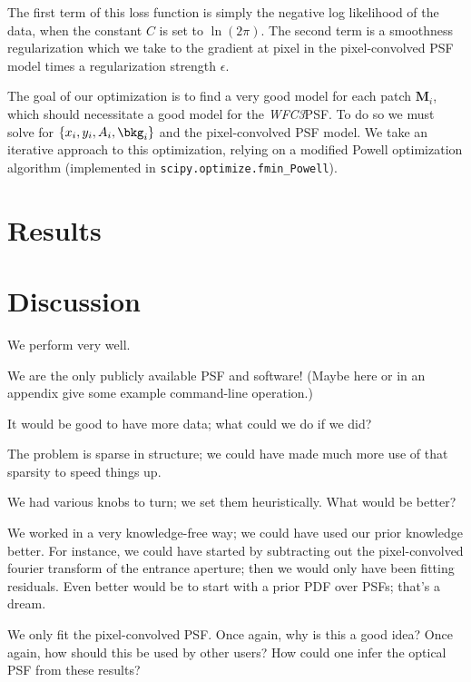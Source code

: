 \documentclass[12pt,letterpaper,preprint]{aastex}
\newcommand{\instrument}[1]{\textsl{#1}}
\newcommand{\vect}[1]{\mathbf{#1}}
\newcommand{\WFC}{\instrument{WFC3}}
\newcommand{\model}{\vect{M}}
\begin{document}
\noindent The first term of this loss function is simply the negative log likelihood of the data, 
when the constant $C$ is set to $\ln(2\pi)$.  The second term is a smoothness regularization which 
we take to the gradient at pixel in the pixel-convolved PSF model times a regularization 
strength $\epsilon$.

The goal of our optimization is to find a very good model for each patch $\model_i$, which should 
necessitate a good model for the \WFC PSF.  To do so we must solve for $\{x_i, y_i, A_i, \bkg_i\}$ 
and the pixel-convolved PSF model.  We take an iterative approach to this optimization, relying on  
a modified Powell optimization algorithm (implemented in \texttt{scipy.optimize.fmin_Powell}). 

\section{Results}

\section{Discussion}

We perform very well.

We are the only publicly available PSF and software!
(Maybe here or in an appendix give some example command-line operation.)

It would be good to have more data;
  what could we do if we did?

The problem is sparse in structure;
  we could have made much more use of that sparsity to speed things up.

We had various knobs to turn; we set them heuristically.
What would be better?

We worked in a very knowledge-free way;
  we could have used our prior knowledge better.
For instance, we could have started by subtracting out the pixel-convolved fourier transform of the entrance aperture;
  then we would only have been fitting residuals.
Even better would be to start with a prior PDF over PSFs;
  that's a dream.

We only fit the pixel-convolved PSF.
Once again, why is this a good idea?
Once again, how should this be used by other users?
How could one infer the optical PSF from these results?
\end{document}
